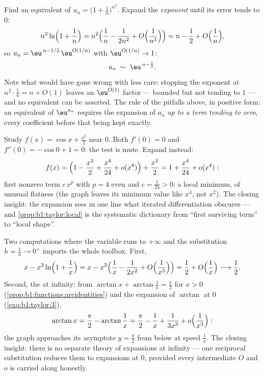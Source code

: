 \begin{example}\label{ex:b1:taylor:expdiscipline}
Find an equivalent of $u_n = \bigl(1 + \frac1n\bigr)^{n^2}$.
Expand the \emph{exponent} until its error tends to $0$:
\[
n^2 \ln\Bigl(1 + \frac1n\Bigr)
= n^2\Bigl(\frac1n - \frac{1}{2n^2} +
O\Bigl(\frac{1}{n^3}\Bigr)\Bigr)
= n - \frac12 + O\Bigl(\frac1n\Bigr),
\]
so $u_n = \eu^{\,n - 1/2}\,\eu^{O(1/n)}$ with $\eu^{O(1/n)} \to
1$:
\[
u_n \;\sim\; \eu^{\,n - \frac12} .
\]
Note what would have gone wrong with less care: stopping the
exponent at $n^2\cdot\frac1n = n + O(1)$ leaves an
$\eu^{O(1)}$ factor --- bounded but not tending to $1$ --- and
no equivalent can be asserted. The rule of
the pitfalls above, in positive form: an equivalent of
$\eu^{a_n}$ requires the expansion of $a_n$ \emph{up to a term
tending to zero}, every coefficient before that being kept
exactly.
\end{example}

\begin{example}\label{ex:b1:taylor:flatmin}
Study $f(x) = \cos x + \frac{x^2}{2}$ near $0$. Both $f'(0) =
0$ and $f''(0) = -\cos 0 + 1 = 0$: the  test is
mute. Expand instead:
\[
f(x) = \Bigl(1 - \frac{x^2}{2} + \frac{x^4}{24} +
o(x^4)\Bigr) + \frac{x^2}{2}
= 1 + \frac{x^4}{24} + o(x^4) :
\]
first nonzero term $c\,x^p$ with $p = 4$ even and $c =
\frac{1}{24} > 0$: a local minimum, of unusual flatness (the
graph leaves its minimum value like $x^4$, not $x^2$). The
closing insight: the expansion sees in one line what iterated
differentiation obscures --- and \cref{prop:b1:taylor:local} is
the systematic dictionary from ``first surviving term'' to
``local shape''.
\end{example}

\begin{example}\label{ex:b1:taylor:atinfinity}
Two computations where the variable runs to $+\infty$ and the
substitution $h = \frac1x \to 0^+$ imports the whole toolbox.
First,
\[
x - x^2\ln\Bigl(1 + \frac1x\Bigr)
= x - x^2\Bigl(\frac1x - \frac{1}{2x^2} +
O\Bigl(\frac{1}{x^3}\Bigr)\Bigr)
= \frac12 + O\Bigl(\frac1x\Bigr) \longrightarrow \frac12 .
\]
Second, the  at infinity: from $\arctan x +
\arctan\frac1x = \frac\pi2$ for $x > 0$
(\cref{prop:b1:functions:arcidentities}) and the expansion of
$\arctan$ at $0$ (\cref{exo:b1:taylor:3}),
\[
\arctan x = \frac\pi2 - \arctan\frac1x
= \frac\pi2 - \frac1x + \frac{1}{3x^3} +
o\Bigl(\frac{1}{x^3}\Bigr) :
\]
the graph approaches its asymptote $y = \frac\pi2$ from below at
speed $\frac1x$. The closing insight: there is no separate
theory of expansions at infinity --- one reciprocal substitution
reduces them to expansions at $0$, provided every intermediate
$O$ and $o$ is carried along honestly.
\end{example}

